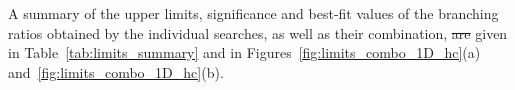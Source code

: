 \documentclass[PAPER, coverpage, atlasdraft=true, texlive=2016, UKenglish]{\ATLASLATEXPATH atlasdoc}
\providecommand{\DIFadd}[1]{{\protect\color{blue}\uwave{#1}}} %
\providecommand{\DIFdel}[1]{{\protect\color{red}\sout{#1}}}                      %
\providecommand{\DIFaddbegin}{} %
\providecommand{\DIFaddend}{} %
\providecommand{\DIFdelbegin}{} %
\providecommand{\DIFdelend}{} %
\begin{document}
A summary of the upper limits, significance and best-fit values of the branching ratios obtained by the individual searches, as well as their combination, \DIFdelbegin \DIFdel{are }\DIFdelend \DIFaddbegin \DIFadd{is }\DIFaddend given  
in Table~\ref{tab:limits_summary} and in Figures~\ref{fig:limits_combo_1D_hc}(a) and~\ref{fig:limits_combo_1D_hc}(b).
\end{document}

